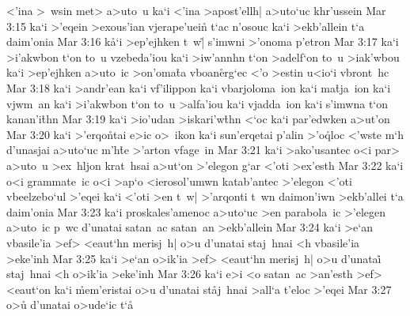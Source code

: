 <'ina
>~wsin
met>
a>uto~u
ka`i
<'ina
>apost'ellh|
a>uto`uc
khr'ussein\bibvsend
\vs Mar 3:15
ka`i
>'eqein
>exous'ian
vjerape'uein\r{}
t`ac
n'osouc
ka`i
>ekb'allein
t`a
daim'onia\bibvsend
\vs Mar 3:16
k\r{a}`i
>ep'ejhken
t~w|\r{}
s'imwni
>'onoma
p'etron\bibvsend
\vs Mar 3:17
ka`i
>i'akwbon
t`on
to~u
vzebeda'iou
ka`i
>iw'annhn
t`on
>adelf`on
to~u
>iak'wbou
ka`i
>ep'ejhken
a>uto~ic
>on'oma\r{t}a
vboan\r{e}rg`ec
<'o
>estin
u<io`i
vbront~hc\bibvsend
\vs Mar 3:18
ka`i
>andr'ean
ka`i
vf'ilippon
ka`i
vbarjoloma~ion
ka`i
ma\r{t}ja~ion
ka`i
vjwm~an
ka`i
>i'akwbon
t`on
to~u
>alfa'iou
ka`i
vjadda~ion
ka`i
s'imwna
t`on
kanan'i\r{t}hn\bibvsend
{}
\vs Mar 3:19
ka`i
>io'udan
>iskari'w\r{t}hn
<`oc
ka`i
par'edwken
a>ut'on\bibvsend
\vs Mar 3:20
ka`i
>'erqo\r{n}tai
e>ic
o>~ikon
ka`i
sun'erqetai
p'alin
>'o\r{q}loc
<'wste
m`h
d'unasjai
a>uto`uc
m'h\r{t}e
>'arton
vfage~in\bibvsend
\vs Mar 3:21
ka`i
>ako'usantec
o<i
par>
a>uto~u
>ex~hljon
krat~hsai
a>ut`on
>'elegon
g`ar
<'oti
>ex'esth\bibvsend
\vs Mar 3:22
ka`i
o<i
grammate~ic
o<i
>ap`o
<ierosol'umwn
katab'antec
>'elegon
<'oti
vbeelzebo`ul
>'eqei
ka`i
<'oti
>en
t~w|
>'arqonti
t~wn
daimon'iwn
>ekb'allei
t`a
daim'onia\bibvsend
\vs Mar 3:23
ka`i
proskales'amenoc
a>uto`uc
>en
parabola~ic
>'elegen
a>uto~ic
p~wc
d'unatai
satan~ac
satan~an
>ekb'allein\bibvsend
\vs Mar 3:24
ka`i
>e`an
vbasile'ia
>ef>
<eaut`hn
merisj~h|
o>u
d'unatai
staj~hnai
<h
vbasile'ia
>eke'inh\bibvsend
\vs Mar 3:25
ka`i
>e`an
o>ik'ia
>ef>
<eaut`hn
merisj~h|
o>u
d'unatai\r{}
staj~hnai
<h
o>ik'ia
>eke'inh\bibvsend
\vs Mar 3:26
ka`i
e>i
<o
satan~ac
>an'esth
>ef>
<eaut`on
ka`i
\r{m}em'eristai
o>u
d'unatai
st\r{a}j~hnai
>all`a
t'eloc
>'eqei\bibvsend
\vs Mar 3:27
o>u\r{}
d'unatai
o>ude`ic
t`a\r{}
